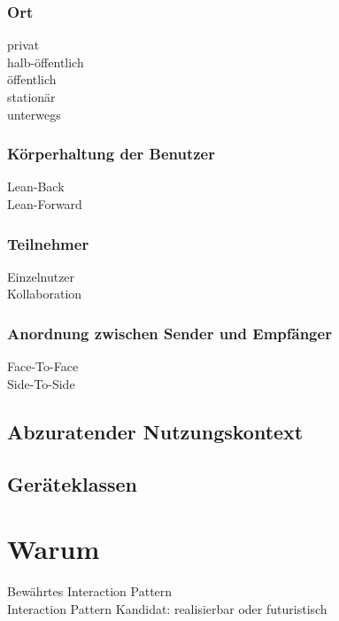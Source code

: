 \subsubsection*{Ort}
\checkbox{\private} privat \\
\checkbox{\semipublic} halb-öffentlich \\
\checkbox{\public} öffentlich \\
\checkbox{\stationary} stationär \\
\checkbox{\onthego} unterwegs 

\subsubsection*{Körperhaltung der Benutzer}
\checkbox{\leanback} Lean-Back \\
\checkbox{\leanforward} Lean-Forward 

\subsubsection*{Teilnehmer}
\checkbox{\single} Einzelnutzer \\
\checkbox{\collaboration} Kollaboration

\subsubsection*{Anordnung zwischen Sender und Empfänger}
\checkbox{\facetoface} Face-To-Face \\
\checkbox{\sidetoside} Side-To-Side

\subsection*{Abzuratender Nutzungskontext}
\notvalidcontext

\subsection*{Geräteklassen}
\devicetabular



\section*{Warum}
\checkbox{\established} Bewährtes Interaction Pattern \\
\checkbox{\candidate} Interaction Pattern Kandidat: 
\checkbox{\realizable} realisierbar oder
\checkbox{\futuristic} futuristisch


